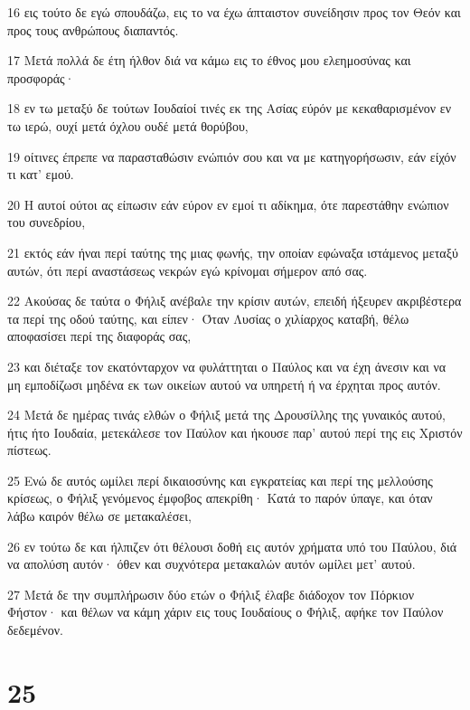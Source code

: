 \par 16 εις τούτο δε εγώ σπουδάζω, εις το να έχω άπταιστον συνείδησιν προς τον Θεόν και προς τους ανθρώπους διαπαντός.
\par 17 Μετά πολλά δε έτη ήλθον διά να κάμω εις το έθνος μου ελεημοσύνας και προσφοράς·
\par 18 εν τω μεταξύ δε τούτων Ιουδαίοί τινές εκ της Ασίας εύρόν με κεκαθαρισμένον εν τω ιερώ, ουχί μετά όχλου ουδέ μετά θορύβου,
\par 19 οίτινες έπρεπε να παρασταθώσιν ενώπιόν σου και να με κατηγορήσωσιν, εάν είχόν τι κατ' εμού.
\par 20 Η αυτοί ούτοι ας είπωσιν εάν εύρον εν εμοί τι αδίκημα, ότε παρεστάθην ενώπιον του συνεδρίου,
\par 21 εκτός εάν ήναι περί ταύτης της μιας φωνής, την οποίαν εφώναξα ιστάμενος μεταξύ αυτών, ότι περί αναστάσεως νεκρών εγώ κρίνομαι σήμερον από σας.
\par 22 Ακούσας δε ταύτα ο Φήλιξ ανέβαλε την κρίσιν αυτών, επειδή ήξευρεν ακριβέστερα τα περί της οδού ταύτης, και είπεν· Όταν Λυσίας ο χιλίαρχος καταβή, θέλω αποφασίσει περί της διαφοράς σας,
\par 23 και διέταξε τον εκατόνταρχον να φυλάττηται ο Παύλος και να έχη άνεσιν και να μη εμποδίζωσι μηδένα εκ των οικείων αυτού να υπηρετή ή να έρχηται προς αυτόν.
\par 24 Μετά δε ημέρας τινάς ελθών ο Φήλιξ μετά της Δρουσίλλης της γυναικός αυτού, ήτις ήτο Ιουδαία, μετεκάλεσε τον Παύλον και ήκουσε παρ' αυτού περί της εις Χριστόν πίστεως.
\par 25 Ενώ δε αυτός ωμίλει περί δικαιοσύνης και εγκρατείας και περί της μελλούσης κρίσεως, ο Φήλιξ γενόμενος έμφοβος απεκρίθη· Κατά το παρόν ύπαγε, και όταν λάβω καιρόν θέλω σε μετακαλέσει,
\par 26 εν τούτω δε και ήλπιζεν ότι θέλουσι δοθή εις αυτόν χρήματα υπό του Παύλου, διά να απολύση αυτόν· όθεν και συχνότερα μετακαλών αυτόν ωμίλει μετ' αυτού.
\par 27 Μετά δε την συμπλήρωσιν δύο ετών ο Φήλιξ έλαβε διάδοχον τον Πόρκιον Φήστον· και θέλων να κάμη χάριν εις τους Ιουδαίους ο Φήλιξ, αφήκε τον Παύλον δεδεμένον.

\chapter{25}

